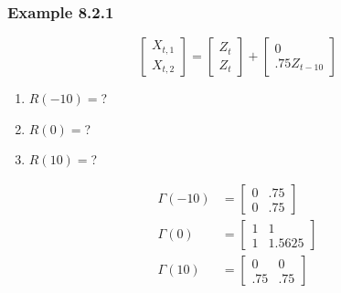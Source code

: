\documentclass{beamer}
\begin{document}

\begin{frame}
\frametitle{Example 8.2.1}
\[
\left[\begin{array}{c}
X_{t,1} \\
X_{t,2}
\end{array}\right]
=
\left[\begin{array}{c}
Z_{t} \\
Z_{t}
\end{array}\right]
+
\left[\begin{array}{c}
0 \\
.75 Z_{t-10}
\end{array}\right]
\]

\begin{enumerate}
\item $R(-10)=$?
\item $R(0)=$?
\item $R(10)=$?
\end{enumerate}
\begin{align*}
\Gamma(-10) &= 
\left[\begin{array}{cc}
0 & .75 \\
0 & .75
\end{array}\right]\\
\Gamma(0) &= 
\left[\begin{array}{cc}
1 & 1 \\
1 & 1.5625
\end{array}\right] \\
\Gamma(10) &= 
\left[\begin{array}{cc}
0 & 0 \\
.75 & .75
\end{array}\right]
\end{align*}

\end{frame}

\end{document}
